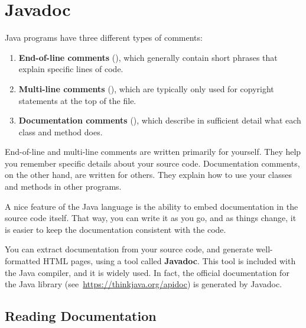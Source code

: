 \chapter{Javadoc}
\label{javadoc}


Java programs have three different types of comments:

\begin{enumerate}
\item {\bf End-of-line comments} (\java{//}), which generally contain short phrases that explain specific lines of code.
\item {\bf Multi-line comments} (\java{/*}), which are typically only used for copyright statements at the top of the file.
\item {\bf Documentation comments} (\java{/**}), which describe in sufficient detail what each class and method does.
\end{enumerate}

End-of-line and multi-line comments are written primarily for yourself.
They help you remember specific details about your source code.
Documentation comments, on the other hand, are written for others.
They explain how to use your classes and methods in other programs.


A nice feature of the Java language is the ability to embed documentation in the source code itself.
That way, you can write it as you go, and as things change, it is easier to keep the documentation consistent with the code.

You can extract documentation from your source code, and generate well-formatted HTML pages, using a tool called {\bf Javadoc}.
This tool is included with the Java compiler, and it is widely used.
In fact, the official documentation for the Java library (see~\url{https://thinkjava.org/apidoc}) is generated by Javadoc.


\section{Reading Documentation}



